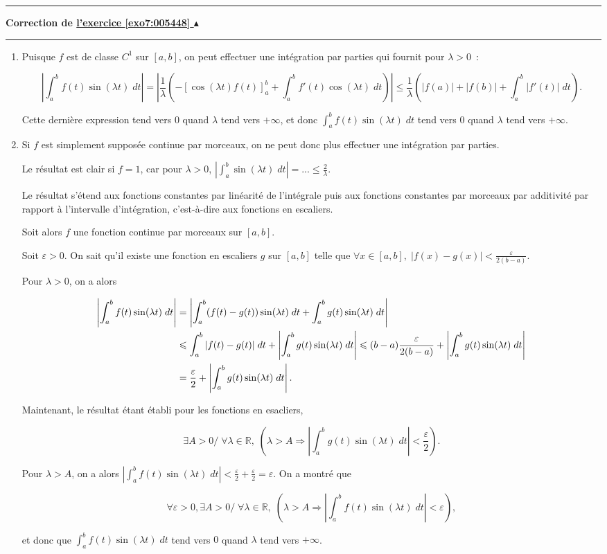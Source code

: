 \documentclass[11pt,a4paper]{article}
\newcommand{\Rr}{\mathbb{R}} \newcommand{\R}{\mathbb{R}}
\newcounter{exo}
\newcommand{\correction}[1]{\hypertarget{cor7:#1}{}\label{cor7:#1}{\bf Correction de \hyperlink{exo7:#1}{l'exercice \ref{exo7:#1} $\blacktriangle$}}\vspace{1mm}\hrule\vspace{1mm}}
\newcommand{\fincorrection}{\vspace{1mm}\hrule\vspace*{7mm}}
\begin{document}
\fincorrection
\correction{005448}
\begin{enumerate}
\item  Puisque $f$ est de classe $C^1$ sur $[a,b]$, on peut effectuer une intégration par parties qui fournit pour $\lambda>0$~:

$$\left|\int_{a}^{b}f(t)\sin(\lambda t)\;dt\right|=\left|\frac{1}{\lambda}(-\left[\cos(\lambda t)f(t)\right]_{a}^{b}+\int_{a}^{b}f'(t)\cos(\lambda t)\;dt)\right|\leq\frac{1}{\lambda}(|f(a)|+|f(b)|+\int_{a}^{b}|f'(t)|\;dt).$$ 

Cette dernière expression tend vers $0$ quand $\lambda$ tend vers $+\infty$, et donc $\int_{a}^{b}f(t)\sin(\lambda t)\;dt$ tend vers $0$ quand $\lambda$ tend vers $+\infty$.

\item  Si $f$ est simplement supposée continue par morceaux, on ne peut donc plus effectuer une intégration par parties.

Le résultat est clair si $f=1$, car pour $\lambda>0$, $\left|\int_{a}^{b}\sin(\lambda t)\;dt\right|=...\leq\frac{2}{\lambda}$.

Le résultat s'étend aux fonctions constantes par linéarité de l'intégrale puis aux fonctions constantes par morceaux par additivité par rapport à l'intervalle d'intégration, c'est-à-dire aux fonctions en escaliers.

Soit alors $f$ une fonction continue par morceaux sur $[a,b]$. 

Soit $\varepsilon>0$. On sait qu'il existe une fonction en escaliers $g$ sur $[a,b]$ telle que $\forall x\in[a,b],\;|f(x)-g(x)|<\frac{\varepsilon}{2(b-a)}$.

Pour $\lambda>0$, on a alors 

\begin{align*}\ensuremath
\left|\int_{a}^{b}f(t)\sin(\lambda t)\;dt\right|&=\left|\int_{a}^{b}(f(t)-g(t))\sin(\lambda t)\;dt+\int_{a}^{b}g(t)\sin(\lambda t)\;dt\right|\\
 &\leq\int_{a}^{b}|f(t)-g(t)|\;dt+\left|\int_{a}^{b}g(t)\sin(\lambda  t)\;dt\right|\leq(b-a)\frac{\varepsilon}{2(b-a)}+\left|\int_{a}^{b}g(t)\sin(\lambda t)\;dt\right|\\
 &=\frac{\varepsilon}{2}+\left|\int_{a}^{b}g(t)\sin(\lambda t)\;dt\right|.
\end{align*}

Maintenant, le résultat étant établi pour les fonctions en esacliers, 

$$\exists A>0/\;\forall\lambda\in\Rr,\;
(\lambda>A\Rightarrow\left|\int_{a}^{b}g(t)\sin(\lambda t)\;dt\right|<\frac{\varepsilon}{2}).$$

Pour $\lambda>A$, on a alors $\left|\int_{a}^{b}f(t)\sin(\lambda t)\;dt\right|<\frac{\varepsilon}{2}+\frac{\varepsilon}{2}=\varepsilon$. On a montré que 

$$\forall\varepsilon>0,\exists A>0/\;\forall\lambda\in\Rr,\;(\lambda>A\Rightarrow\left|\int_{a}^{b}f(t)\sin(\lambda t)\;dt\right|<\varepsilon),$$

et donc que $\int_{a}^{b}f(t)\sin(\lambda t)\;dt$ tend vers $0$ quand $\lambda$ tend vers $+\infty$.
\end{enumerate}
\end{document}
